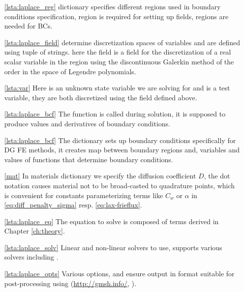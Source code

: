 \begin{itemize}
  \item[\ref{lsta:laplace_reg}]  dictionary
  specifies different regions used in boundary conditions specification, 
  region is required for setting up fields,  regions are needed for BCs.
  \item[\ref{lsta:laplace_field}]   determine
  discretization spaces of variables and are defined using tuple of strings.
   here the field  is a field for the discretization of a real scalar
  variable in the region  using the discontinuous Galerkin method of the order
   in the space of Legendre polynomials.
  \item[\ref{lsta:var}]  Here  is an unknown state variable we are solving for
  and  is a test variable, they are both discretized using the field 
  defined above.
  \item[\ref{lsta:laplace_bcf}] The function  is called during solution, it is
  supposed to produce values and derivatives of boundary conditions.
  \item[\ref{lsta:laplace_bcf}] The  dictionary sets up boundary
  conditions specifically for DG FE methods, it creates map between
  boundary regions and, variables and values of functions that determine boundary
  conditions.
  \item[\ref{mat}] In materials dictionary we specify the diffusion coefficient $D$, the dot
  notation  causes material not to be broad-casted to quadrature points,
  which is convenient for constants parameterizing terms like $C_w$ or $\alpha$ in
  \eqref{eq:diff_penalty_sigma} resp. \eqref{eq:lax-frieflux}.
  \item[\ref{lsta:laplace_eq}] The equation to solve is composed of terms derived in
  Chapter \ref{ch:theory}.
  \item[\ref{lsta:laplace_solv}] Linear and non-linear solvers to use, \sfepy{} supports
  various solvers including  \cite{MUMPS:2}.
  \item[\ref{lsta:laplace_opts}] Various options,  and
   ensure output in format suitable for
  post-processing using  (\url{http://gmsh.info/}, \cite{Remacle2007}).
\end{itemize}


